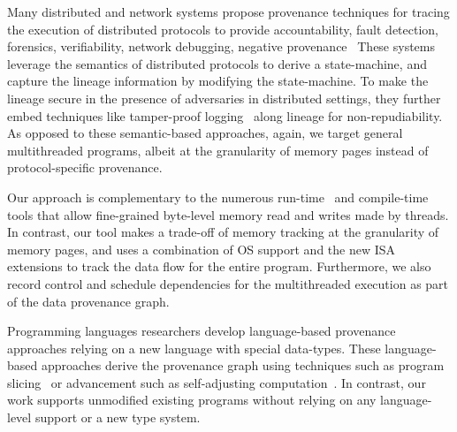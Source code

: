  Many distributed and network systems propose provenance techniques for tracing the  execution of distributed protocols to provide accountability, fault detection, forensics, verifiability, network debugging, negative provenance~\cite{snp}%
These systems leverage the semantics of distributed protocols to derive a state-machine, and capture the lineage information by modifying the state-machine. To make the lineage secure in the presence of adversaries in distributed settings, they further embed techniques like tamper-proof logging~\cite{peer-review} along lineage for non-repudiability.   As opposed to these semantic-based approaches, again, we target general multithreaded programs, albeit at the granularity of memory pages instead of protocol-specific provenance.



 Our approach is complementary to the numerous run-time~\cite{valgrind,memtrace} and compile-time~\cite{cgo-compiler-provenance} tools that allow fine-grained byte-level memory read and writes made by threads. In contrast, our tool makes a trade-off of memory tracking at the granularity of memory pages, and uses a combination of OS support and the new ISA extensions to track the data flow for the entire program. Furthermore, we also record control and schedule dependencies for the multithreaded execution as part of the data provenance graph. 



 Programming languages researchers develop language-based provenance approaches relying on a new language with special data-types. These language-based approaches derive the provenance graph using techniques such as  program slicing~\cite{roly} or advancement such as self-adjusting computation~\cite{Acar05}. In contrast, our work supports unmodified existing programs without relying on any language-level support or a new type system.



